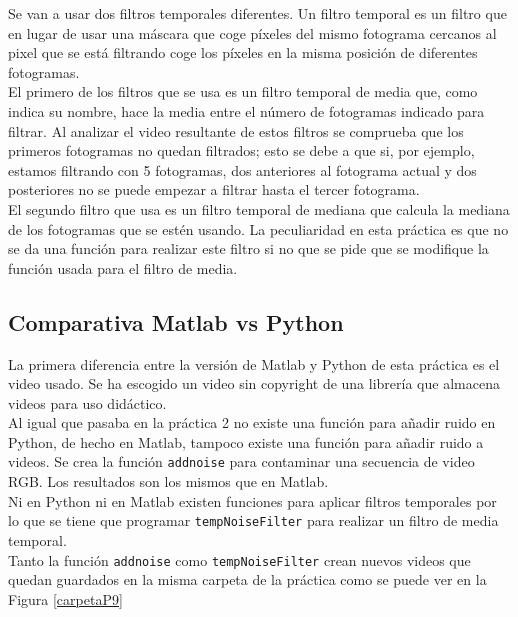Se van a usar dos filtros temporales diferentes. Un filtro temporal es un filtro que en lugar de usar una máscara que coge píxeles del mismo fotograma cercanos al pixel que se está filtrando coge los píxeles en la misma posición de diferentes fotogramas.\\

El primero de los filtros que se usa es un filtro temporal de media que, como indica su nombre, hace la media  entre el número de fotogramas indicado para filtrar. Al analizar el video resultante de estos filtros se comprueba que los primeros fotogramas no quedan filtrados; esto se debe a que si, por ejemplo, estamos filtrando con 5 fotogramas, dos anteriores al fotograma actual y dos posteriores no se puede empezar a filtrar hasta el tercer fotograma.\\

El segundo filtro que usa es un filtro temporal de mediana que calcula la mediana de los fotogramas que se estén usando. La peculiaridad en esta práctica es que no se da una función para realizar este filtro si no que se pide que se modifique la función usada para el filtro de media.\\

\subsection{Comparativa Matlab vs Python}

La primera diferencia entre la versión de Matlab y Python de esta práctica es el video usado. Se ha escogido un video sin copyright de una librería que almacena videos para uso didáctico.\\

Al igual que pasaba en la práctica 2 no existe una función para añadir ruido en Python, de hecho en Matlab, tampoco existe una función para añadir ruido a videos. Se crea la función \texttt{addnoise} para contaminar una secuencia de video RGB. Los resultados son los mismos que en Matlab.\\

Ni en Python ni en Matlab existen funciones para aplicar filtros temporales por lo que se tiene que programar \texttt{tempNoiseFilter} para realizar un filtro de media temporal.\\ 

Tanto la función \texttt{addnoise} como \texttt{tempNoiseFilter} crean nuevos videos que quedan guardados en la misma carpeta de la práctica como se puede ver en la Figura \ref{carpetaP9}

